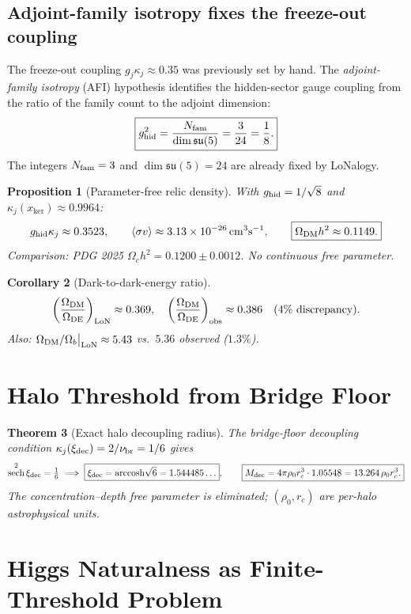 \documentclass[12pt]{article}
\theoremstyle{plain}
\newtheorem{theorem}{Theorem}[section]
\newtheorem{proposition}[theorem]{Proposition}
\newtheorem{corollary}[theorem]{Corollary}
\theoremstyle{definition}
\numberwithin{equation}{section}
\newcommand{\br}{\mathrm{br}}
\newcommand{\kker}{\mathrm{ker}}
\DeclareMathOperator{\sech}{sech}
\begin{document}
\subsection{Adjoint-family isotropy fixes the freeze-out coupling}

The freeze-out coupling $g_j\kappa_j\approx0.35$ was previously set by hand.
The \emph{adjoint-family isotropy} (AFI) hypothesis identifies the hidden-sector gauge coupling from the ratio of the family count to the adjoint dimension:
\[
\boxed{g_{\rm hid}^2 = \frac{N_{\rm fam}}{\dim\mathfrak{su}(5)} = \frac{3}{24} = \frac{1}{8}.}
\]
The integers $N_{\rm fam}=3$ and $\dim\mathfrak{su}(5)=24$ are already fixed by LoNalogy.

\begin{proposition}[Parameter-free relic density]\label{prop:relic2}
With $g_{\rm hid}=1/\sqrt{8}$ and $\kappa_j(x_{\kker})\approx0.9964$:
\[
g_{\rm hid}\kappa_j \approx 0.3523,\qquad
\langle\sigma v\rangle \approx 3.13\times10^{-26}\,\mathrm{cm}^3\mathrm{s}^{-1},\qquad
\boxed{\Omega_{\rm DM}h^2 \approx 0.1149.}
\]
Comparison: PDG 2025 $\Omega_c h^2=0.1200\pm0.0012$.  No continuous free parameter.
\end{proposition}

\begin{corollary}[Dark-to-dark-energy ratio]
\[
\left(\frac{\Omega_{\rm DM}}{\Omega_{\rm DE}}\right)_{\rm LoN}\approx0.369,\quad
\left(\frac{\Omega_{\rm DM}}{\Omega_{\rm DE}}\right)_{\rm obs}\approx0.386\quad(4\%\text{ discrepancy}).
\]
Also: $\Omega_{\rm DM}/\Omega_b\big|_{\rm LoN}\approx5.43$ vs.\ $5.36$ observed ($1.3\%$).
\end{corollary}

\section{Halo Threshold from Bridge Floor}\label{sec:haloclose}

\begin{theorem}[Exact halo decoupling radius]\label{thm:haloexact}
The bridge-floor decoupling condition $\kappa_j(\xi_{\rm dec})=2/\nu_\br=1/6$ gives
\[
\sech^2\xi_{\rm dec}=\tfrac{1}{6}
\;\Longrightarrow\;
\boxed{\xi_{\rm dec}=\mathrm{arccosh}\sqrt{6}=1.544485\ldots},\qquad
\boxed{M_{\rm dec}=4\pi\rho_0 r_c^3\cdot1.05548=13.264\,\rho_0 r_c^3.}
\]
The concentration--depth free parameter is eliminated; $(\rho_0,r_c)$ are per-halo astrophysical units.
\end{theorem}

\section{Higgs Naturalness as Finite-Threshold Problem}\label{sec:hierarchy}
\end{document}
